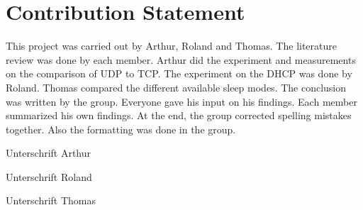 \chapter*{Contribution Statement}
This project was carried out by Arthur, Roland and Thomas. The literature review was done by each member.
Arthur did the experiment and measurements on the comparison of UDP to TCP.
The experiment on the DHCP was done by Roland.
Thomas compared the different available sleep modes.
The conclusion was written by the group. Everyone gave his input on his findings.
Each member summarized his own findings. At the end, the group corrected spelling mistakes together. Also the formatting was done in the group.

\vspace{2cm}

\begin{minipage}[t]{0.3\textwidth}
    Unterschrift Arthur
\end{minipage}
\begin{minipage}[t]{0.3\textwidth}
    Unterschrift Roland
\end{minipage}
\begin{minipage}[t]{0.3\textwidth}
    Unterschrift Thomas
\end{minipage}